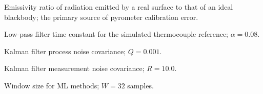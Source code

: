 \begin{description}[leftmargin=3cm, style=nextline]
\item[$\varepsilon$] Emissivity ratio of radiation emitted by a real surface to that of an ideal blackbody; the primary source of pyrometer calibration error.
\item[$\alpha$]    Low-pass filter time constant for the simulated thermocouple reference; $\alpha = 0.08$.
\item[$Q$]         Kalman filter process noise covariance; $Q = 0.001$.
\item[$R$]         Kalman filter measurement noise covariance; $R = 10.0$.
\item[$W$]         Window size for ML methods; $W = 32$ samples.
\end{description}
